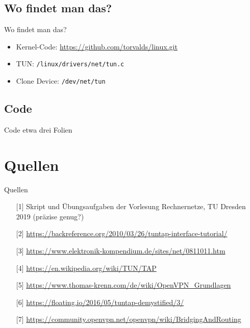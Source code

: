 \documentclass[ngerman,aspectratio=169]{beamer}
\begin{document}
	\subsection{Wo findet man das?}
	\begin{frame}{Wo findet man das?}
		\begin{itemize}
			\item Kernel-Code: \url{https://github.com/torvalds/linux.git}
			\item TUN: \texttt{/linux/drivers/net/tun.c}
			\item Clone Device: \texttt{/dev/net/tun}
		\end{itemize}
	\end{frame}
	
	\subsection{Code}
	\begin{frame}{Code}
		etwa drei Folien
	\end{frame}

	\section{Quellen}
	\begin{frame}{Quellen}
		\begin{enumerate}
			\item[{[1]}] Skript und Übungsaufgaben der Vorlesung Rechnernetze, TU Dresden 2019 (präzise genug?) \label{ref:rene}
			\item[{[2]}] \url{https://backreference.org/2010/03/26/tuntap-interface-tutorial/}
			\item[{[3]}] \url{https://www.elektronik-kompendium.de/sites/net/0811011.htm}
			\item[{[4]}] \url{https://en.wikipedia.org/wiki/TUN/TAP}
			\item[{[5]}] \url{https://www.thomas-krenn.com/de/wiki/OpenVPN_Grundlagen}
			\item[{[6]}] \url{https://floating.io/2016/05/tuntap-demystified/3/}
			\item [{[7]}] \url{https://community.openvpn.net/openvpn/wiki/BridgingAndRouting} \label{ref:openvpn}
		\end{enumerate}
\end{frame}
\end{document}
